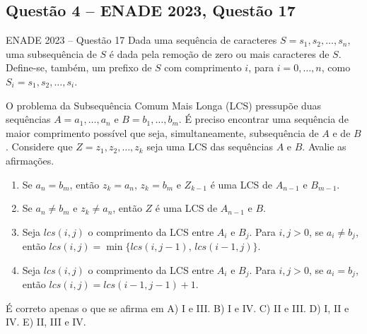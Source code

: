 \documentclass[11pt,a4paper]{article}
\begin{document}
\subsection{Questão 4 -- ENADE 2023, Questão 17}
\begin{enunciado}{ENADE 2023 -- Questão 17}
Dada uma sequência de caracteres $S = s_1, s_2, \dots, s_n$, uma subsequência de $S$ é dada pela
remoção de zero ou mais caracteres de $S$. Define-se, também, um prefixo de $S$ com comprimento $i$,
para $i = 0, \dots, n$, como $S_i = s_1, s_2, \dots, s_i$.

O problema da Subsequência Comum Mais Longa (LCS) pressupõe duas sequências
$A = a_1, \dots, a_n$ e $B = b_1, \dots, b_m$. É preciso encontrar uma sequência de maior comprimento
possível que seja, simultaneamente, subsequência de $A$ e de $B$. Considere que
$Z = z_1, z_2, \dots, z_k$ seja uma LCS das sequências $A$ e $B$. Avalie as afirmações.
\begin{enumerate}[label=\Roman*.]
  \item Se $a_n = b_m$, então $z_k = a_n$, $z_k = b_m$ e $Z_{k-1}$ é uma LCS de $A_{n-1}$ e $B_{m-1}$.
  \item Se $a_n \ne b_m$ e $z_k \ne a_n$, então $Z$ é uma LCS de $A_{n-1}$ e $B$.
  \item Seja $lcs(i,j)$ o comprimento da LCS entre $A_i$ e $B_j$. Para $i,j>0$, se $a_i \ne b_j$, então
  $lcs(i,j) = \min\{lcs(i,j-1),\, lcs(i-1,j)\}$.
  \item Seja $lcs(i,j)$ o comprimento da LCS entre $A_i$ e $B_j$. Para $i,j>0$, se $a_i = b_j$, então
  $lcs(i,j) = lcs(i-1,j-1)+1$.
\end{enumerate}
É correto apenas o que se afirma em\quad
A) I e III. \quad B) I e IV. \quad C) II e III. \quad D) I, II e IV. \quad E) II, III e IV.
\end{enunciado}
\end{document}
